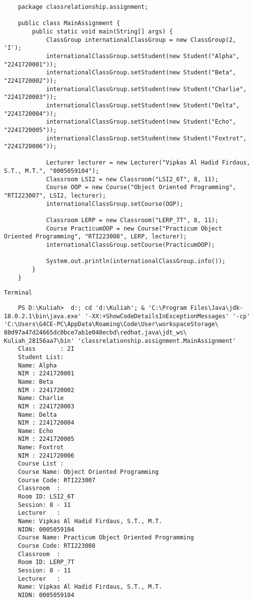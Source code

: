 \documentclass[12pt,titlepage]{article}
\begin{document}
\begin{verbatim}
    package classrelationship.assignment;

    public class MainAssignment {
        public static void main(String[] args) {
            ClassGroup internationalClassGroup = new ClassGroup(2, 'I');
            internationalClassGroup.setStudent(new Student("Alpha", "2241720001"));
            internationalClassGroup.setStudent(new Student("Beta", "2241720002"));
            internationalClassGroup.setStudent(new Student("Charlie", "2241720003"));
            internationalClassGroup.setStudent(new Student("Delta", "2241720004"));
            internationalClassGroup.setStudent(new Student("Echo", "2241720005"));
            internationalClassGroup.setStudent(new Student("Foxtrot", "2241720006"));

            Lecturer lecturer = new Lecturer("Vipkas Al Hadid Firdaus, S.T., M.T.", "0005059104");
            Classroom LSI2 = new Classroom("LSI2_6T", 8, 11);
            Course OOP = new Course("Object Oriented Programming", "RTI223007", LSI2, lecturer);
            internationalClassGroup.setCourse(OOP);

            Classroom LERP = new Classroom("LERP_7T", 8, 11);
            Course PracticumOOP = new Course("Practicum Object Oriented Programming", "RTI223008", LERP, lecturer);
            internationalClassGroup.setCourse(PracticumOOP);

            System.out.println(internationalClassGroup.info());
        }
    }
\end{verbatim}
\texttt{Terminal}
\begin{verbatim}
    PS D:\Kuliah>  d:; cd 'd:\Kuliah'; & 'C:\Program Files\Java\jdk-18.0.2.1\bin\java.exe' '-XX:+ShowCodeDetailsInExceptionMessages' '-cp' 'C:\Users\G4CE-PC\AppData\Roaming\Code\User\workspaceStorage\ 80d97a47d24665dc0bce7ab1e048ecbd\redhat.java\jdt_ws\ Kuliah_28156aa7\bin' 'classrelationship.assignment.MainAssignment' 
    Class       : 2I 
    Student List:
    Name: Alpha
    NIM : 2241720001
    Name: Beta
    NIM : 2241720002
    Name: Charlie
    NIM : 2241720003
    Name: Delta
    NIM : 2241720004
    Name: Echo
    NIM : 2241720005
    Name: Foxtrot
    NIM : 2241720006
    Course List :
    Course Name: Object Oriented Programming
    Course Code: RTI223007
    Classroom  :
    Room ID: LSI2_6T
    Session: 8 - 11
    Lecturer   :
    Name: Vipkas Al Hadid Firdaus, S.T., M.T.
    NIDN: 0005059104
    Course Name: Practicum Object Oriented Programming
    Course Code: RTI223008
    Classroom  :
    Room ID: LERP_7T
    Session: 8 - 11
    Lecturer   :
    Name: Vipkas Al Hadid Firdaus, S.T., M.T.
    NIDN: 0005059104
\end{verbatim}
\end{document}
